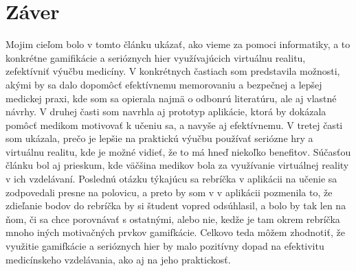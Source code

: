 \documentclass[10pt,twoside,slovak,a4paper]{article}
\begin{document}
\section{Záver} \label{zaver} 
Mojim cieľom bolo v tomto článku ukázať, ako vieme za pomoci informatiky, a to konkrétne gamifikácie a serióznych hier využívajúcich virtuálnu realitu, zefektívniť výučbu medicíny. V konkrétnych častiach som predstavila možnosti, akými by sa dalo dopomôcť efektívnemu memorovaniu a bezpečnej a lepšej medickej praxi, kde som sa opierala najmä o odbonrú literatúru, ale aj vlastné návrhy. V druhej časti som navrhla aj prototyp aplikácie, ktorá by dokázala pomôcť medikom motivovať k učeniu sa, a navyše aj efektívnemu. V tretej časti som ukázala, prečo je lepšie na praktickú výučbu používať seriózne hry a virtuálnu realitu, kde je možné vidieť, že to má hneď niekoľko benefitov. Súčasťou článku bol aj prieskum, kde väčšina medikov bola za využívanie virtuálnej reality v ich vzdelávaní. Poslednú otázku týkajúcu sa rebríčka v aplikácii na učenie sa zodpovedali presne na polovicu, a preto by som v v aplikácii pozmenila to, že zdieľanie bodov do rebríčka by si študent vopred odsúhlasil, a bolo by tak len na ňom, či sa chce porovnávať s ostatnými, alebo nie, kedže je tam okrem rebríčka mnoho iných motivačných prvkov gamifkácie. Celkovo teda môžem zhodnotiť, že využitie gamifkácie a serióznych hier by malo pozitívny dopad na efektivitu medicínskeho vzdelávania, ako aj na jeho praktickosť.




\end{document}
